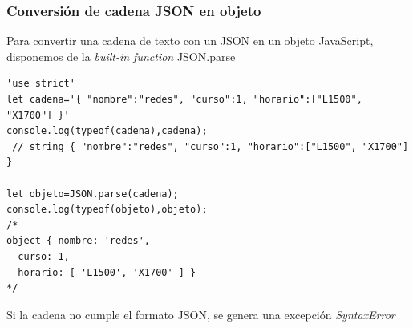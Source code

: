 \documentclass[ucs]{beamer}
\begin{document}
\begin{frame}[fragile]
\frametitle{Conversión de cadena JSON en objeto}
Para convertir una cadena de texto con un JSON en un objeto
JavaScript, disponemos de la 
\emph{built-in function} JSON.parse

  \begin{scriptsize}
  \begin{verbatim}
'use strict'
let cadena='{ "nombre":"redes", "curso":1, "horario":["L1500", "X1700"] }'
console.log(typeof(cadena),cadena);
 // string { "nombre":"redes", "curso":1, "horario":["L1500", "X1700"] }

let objeto=JSON.parse(cadena);
console.log(typeof(objeto),objeto);
/*
object { nombre: 'redes',
  curso: 1,
  horario: [ 'L1500', 'X1700' ] }
*/

  \end{verbatim}
  \end{scriptsize}

Si la cadena no cumple el formato JSON, se genera una excepción
\emph{SyntaxError}

\end{frame}
\end{document}
